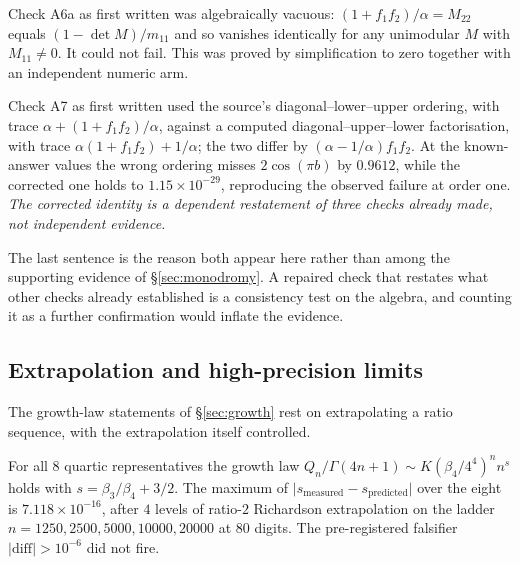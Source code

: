 \begin{remark}
Check A6a as first written was algebraically vacuous: $(1+f_1f_2)/\alpha=M_{22}$
equals $(1-\det M)/m_{11}$ and so vanishes identically for any unimodular $M$
with $M_{11}\neq0$. It could not fail. This was proved by simplification to
zero together with an independent numeric arm.
\end{remark}

\begin{remark}
Check A7 as first written used the source's diagonal--lower--upper ordering,
with trace $\alpha+(1+f_1f_2)/\alpha$, against a computed
diagonal--upper--lower factorisation, with trace
$\alpha(1+f_1f_2)+1/\alpha$; the two differ by
$(\alpha-1/\alpha)f_1f_2$. At the known-answer values the wrong ordering misses
$2\cos(\pi b)$ by $0.9612$, while the corrected one holds to
$1.15\times10^{-29}$, reproducing the observed failure at order one.
\emph{The corrected identity is a dependent restatement of three checks
already made, not independent evidence.}
\end{remark}

The last sentence is the reason both appear here rather than among the
supporting evidence of \S\ref{sec:monodromy}. A repaired check that restates
what other checks already established is a consistency test on the algebra, and
counting it as a further confirmation would inflate the evidence.

\subsection{Extrapolation and high-precision limits}\label{ssec:methods-extrapolation}

The growth-law statements of \S\ref{sec:growth} rest on extrapolating a ratio
sequence, with the extrapolation itself controlled.

\begin{remark}
For all $8$ quartic representatives the growth law
$Q_n/\Gamma(4n+1)\sim K(\beta_4/4^{4})^{n}n^{s}$ holds with
$s=\beta_3/\beta_4+3/2$. The maximum of
$\lvert s_{\text{measured}}-s_{\text{predicted}}\rvert$ over the eight is
$7.118\times10^{-16}$, after $4$ levels of ratio-$2$ Richardson extrapolation
on the ladder $n=1250,2500,5000,10000,20000$ at $80$ digits. The
pre-registered falsifier $\lvert\text{diff}\rvert>10^{-6}$ did not fire.
\end{remark}

